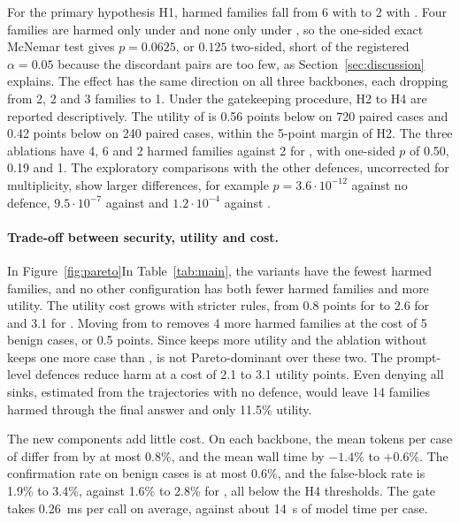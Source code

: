 For the primary hypothesis H1, harmed families fall from 6 with \strSand{} to 2 with \ours. Four families are harmed
only under \strSand{} and none only under \ours, so the one-sided exact McNemar test gives $p = 0.0625$, or $0.125$
two-sided, short of the registered $\alpha = 0.05$ because the discordant pairs are too few, as
Section~\ref{sec:discussion} explains. The effect has the same direction on all three backbones, each dropping from 2, 2
and 3 families to 1. Under the gatekeeping procedure, H2 to H4 are reported descriptively. The utility of
\ours{} is 0.56 points below \strSand{} on 720 paired \bPlain{} cases and 0.42 points below on 240 paired \bAuth{}
cases, within the 5-point margin of H2. The three ablations have 4, 6 and 2 harmed families against 2 for \ours, with
one-sided $p$ of 0.50, 0.19 and 1. The exploratory comparisons with the other defences, uncorrected for multiplicity,
show larger differences, for example $p = 3.6\cdot10^{-12}$ against no defence, $9.5\cdot10^{-7}$ against \cSand{}
and $1.2\cdot10^{-4}$ against \strRules.



\paragraph{Trade-off between security, utility and cost.} \ifpareto In Figure~\ref{fig:pareto}\else In
Table~\ref{tab:main}\fi, the \ours{} variants have the fewest harmed families, and no other configuration has both fewer
harmed families and more utility. The utility cost grows with stricter rules, from 0.8 points for \strRules{} to 2.6 for
\strSand{} and 3.1 for \ours. Moving from \strSand{} to \ours{} removes 4 more harmed families at the cost of 5 benign
cases, or 0.5 points. Since \strSand{} keeps more utility and the ablation without \pThree{} keeps one more case than
\ours, \ours{} is not Pareto-dominant over these two. The prompt-level defences reduce harm at a cost of 2.1 to 3.1
utility points. Even denying all sinks, estimated from the trajectories with no defence, would leave 14 families harmed
through the final answer and only 11.5\% utility.

The new components add little cost. On each backbone, the mean tokens per case of \ours{} differ from \strSand{}
by at most 0.8\%, and the mean wall time by $-1.4\%$ to $+0.6\%$. The confirmation rate on benign cases is at
most 0.6\%, and the false-block rate is 1.9\% to 3.4\%, against 1.6\% to 2.8\% for \strSand, all below the H4
thresholds. The gate takes 0.26~ms per call on average, against about 14~s of model time per case.

